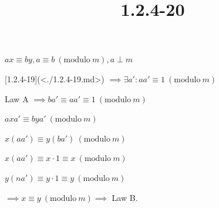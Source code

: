 \documentclass{article}
\title{1.2.4-20}
\begin{document}
\maketitle

\( ax \equiv by, a \equiv b\ (\mathrm{modulo}\ m), a \perp m \)

[1.2.4-19](<./1.2.4-19.md>) \( \implies \exists a': aa' \equiv 1\ (\mathrm{modulo}\ m) \)

Law A \( \implies ba' \equiv aa' \equiv 1\ (\mathrm{modulo}\ m) \)

\( axa' \equiv bya'\ (\mathrm{modulo}\ m) \)

\( x(aa') \equiv y(ba')\ (\mathrm{modulo}\ m) \)

\( x(aa') \equiv x\cdot 1 \equiv x\ (\mathrm{modulo}\ m) \)

\( y(na') \equiv y\cdot 1 \equiv y\ (\mathrm{modulo}\ m) \)

\( \implies x \equiv y\ (\mathrm{modulo}\ m) \implies \) Law B.
\end{document}
